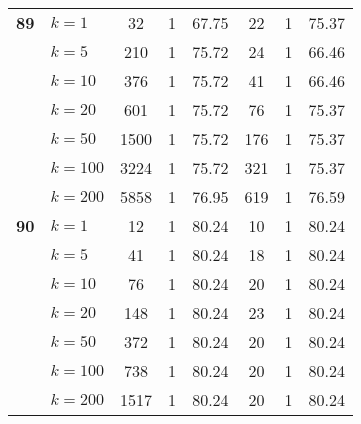 \begin{table}[htbp]
\begin{tabular}{|l|l|c|c|c|c|c|c|}
    \multicolumn{1}{|r|}{\textbf{89}} & $k=1$ & 32 & 1 & 67.75 & 22 & 1 & 75.37 \\ 
     & $k=5$ & 210 & 1 & 75.72 & 24 & 1 & 66.46 \\ 
     & $k=10$ & 376 & 1 & 75.72 & 41 & 1 & 66.46 \\ 
     & $k=20$ & 601 & 1 & 75.72 & 76 & 1 & 75.37 \\ 
     & $k=50$ & 1500 & 1 & 75.72 & 176 & 1 & 75.37 \\ 
     & $k=100$ & 3224 & 1 & 75.72 & 321 & 1 & 75.37 \\ 
     & $k=200$ & 5858 & 1 & 76.95 & 619 & 1 & 76.59 \\ \hline
    \multicolumn{1}{|r|}{\textbf{90}} & $k=1$ & 12 & 1 & 80.24 & 10 & 1 & 80.24 \\ 
     & $k=5$ & 41 & 1 & 80.24 & 18 & 1 & 80.24 \\ 
     & $k=10$ & 76 & 1 & 80.24 & 20 & 1 & 80.24 \\ 
     & $k=20$ & 148 & 1 & 80.24 & 23 & 1 & 80.24 \\ 
     & $k=50$ & 372 & 1 & 80.24 & 20 & 1 & 80.24 \\ 
     & $k=100$ & 738 & 1 & 80.24 & 20 & 1 & 80.24 \\ 
     & $k=200$ & 1517 & 1 & 80.24 & 20 & 1 & 80.24 \\ \hline
    \end{tabular}
\end{table}
